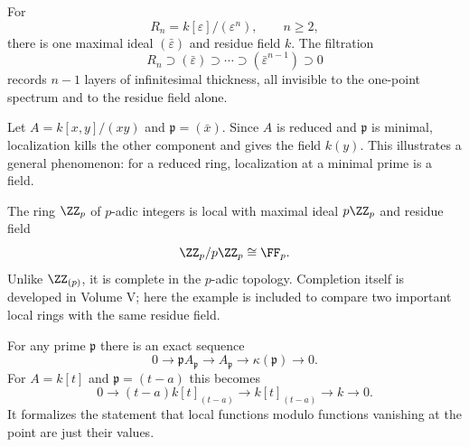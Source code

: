 \begin{example}
For
\[
R_n=k[\varepsilon]/(\varepsilon^n),\qquad n\ge2,
\]
there is one maximal ideal $(\bar\varepsilon)$ and residue field $k$.  The filtration
\[
R_n\supset(\bar\varepsilon)\supset\cdots\supset(\bar\varepsilon^{n-1})\supset0
\]
records $n-1$ layers of infinitesimal thickness, all invisible to the one-point spectrum and
to the residue field alone.
\end{example}

\begin{example}
Let $A=k[x,y]/(xy)$ and $\mathfrak p=(\bar x)$.  Since $A$ is reduced and $\mathfrak p$ is
minimal, localization kills the other component and gives the field $k(y)$.  This illustrates
a general phenomenon: for a reduced ring, localization at a minimal prime is a field.
\end{example}

\begin{example}
The ring $\ZZ_p$ of $p$-adic integers is local with maximal ideal $p\ZZ_p$ and residue field
\[
\ZZ_p/p\ZZ_p\cong\FF_p.
\]
Unlike $\ZZ_{(p)}$, it is complete in the $p$-adic topology.  Completion itself is developed
in Volume V; here the example is included to compare two important local rings with the same
residue field.
\end{example}

\begin{example}
For any prime $\mathfrak p$ there is an exact sequence
\[
0\to\mathfrak pA_{\mathfrak p}
\to A_{\mathfrak p}
\to\kappa(\mathfrak p)
\to0.
\]
For $A=k[t]$ and $\mathfrak p=(t-a)$ this becomes
\[
0\to(t-a)k[t]_{(t-a)}
\to k[t]_{(t-a)}
\to k
\to0.
\]
It formalizes the statement that local functions modulo functions vanishing at the point are
just their values.
\end{example}
